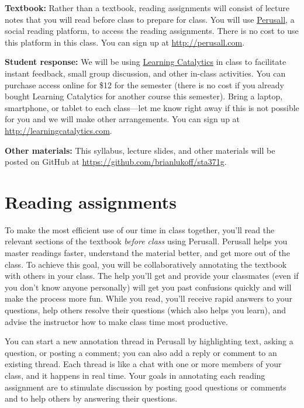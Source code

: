\documentclass[12pt]{article}
\begin{document}
\textbf{Textbook:} Rather than a textbook, reading assignments will consist of lecture notes that you will read before class to prepare for class.  You will use \href{http://perusall.com}{Perusall}, a social reading platform, to access the reading assignments. There is no cost to use this platform in this class. You can sign up at \url{http://perusall.com}.


\textbf{Student response:} We will be using \href{http://learningcatalytics.com}{Learning Catalytics} in class to facilitate instant feedback, small group discussion, and other in-class activities.  You can purchase access online for \$12 for the semester (there is no cost if you already bought Learning Catalytics for another course this semester).  Bring a laptop, smartphone, or tablet to each class---let me know right away if this is not possible for you and we will make other arrangements. You can sign up at \url{http://learningcatalytics.com}.


\textbf{Other materials:} This syllabus, lecture slides, and other materials will be posted on GitHub at \url{https://github.com/brianlukoff/sta371g}. 


\section*{Reading assignments}


To make the most efficient use of our time in class together, you'll read the relevant sections of the textbook \emph{before class} using Perusall. 
Perusall helps you master readings faster, understand the material better, and get more out of the class. To achieve this goal, you will be collaboratively annotating the textbook with others in your class. The help you'll get and provide your classmates (even if you don't know anyone personally) will get you past confusions quickly and will make the process more fun. While you read, you'll receive rapid answers to your questions, help others resolve their questions (which also helps you learn), and advise the instructor how to make class time most productive. 


You can start a new annotation thread in Perusall by highlighting text, asking a question, or posting a comment; you can also add a reply or comment to an existing thread. Each thread is like a chat with one or more members of your class, and it happens in real time. Your goals in annotating each reading assignment are to stimulate discussion by posting good questions or comments and to help others by answering their questions.
\end{document}
